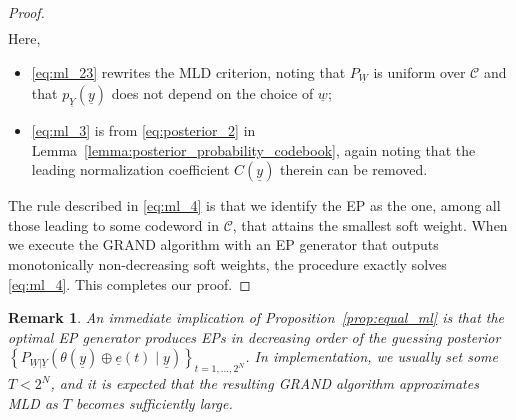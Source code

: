 \documentclass[letterpaper,draftclsnofoot,onecolumn]{IEEEtran}
\newtheorem{remark}{Remark}
\begin{document}
\begin{proof}
\begin{align}
\end{align}
Here,
\begin{itemize}
    \item \eqref{eq:ml_23} rewrites the MLD criterion, noting that $P_{\underline{W}}$ is uniform over $\mathcal{C}$ and that $p_{\underline{Y}}(\underline{y})$ does not depend on the choice of $\underline{w}$;
    \item \eqref{eq:ml_3} is from \eqref{eq:posterior_2} in Lemma~\ref{lemma:posterior_probability_codebook}, again noting that the leading normalization coefficient $C(\underline{y})$ therein can be removed.
\end{itemize}
The rule described in \eqref{eq:ml_4} is that we identify the EP as the one, among all those leading to some codeword in $\mathcal{C}$, that attains the smallest soft weight. When we execute the GRAND algorithm with an EP generator that outputs monotonically non-decreasing soft weights, the procedure exactly solves \eqref{eq:ml_4}. This completes our proof.
\end{proof}

\begin{remark}\label{remark:equal_ml}
    An immediate implication of Proposition~\ref{prop:equal_ml} is that the optimal EP generator produces EPs in decreasing order of the guessing posterior $\left\{P_{\underline{W}|\underline{Y}}(\theta(\underline{y})\oplus \underline{e}(t) \mid \underline{y})\right\}_{t = 1, \ldots, 2^N}$.
    In implementation, we usually set some $T < 2^N$, and it is expected that the resulting GRAND algorithm approximates MLD as $T$ becomes sufficiently large.
\end{remark}
\end{document}
